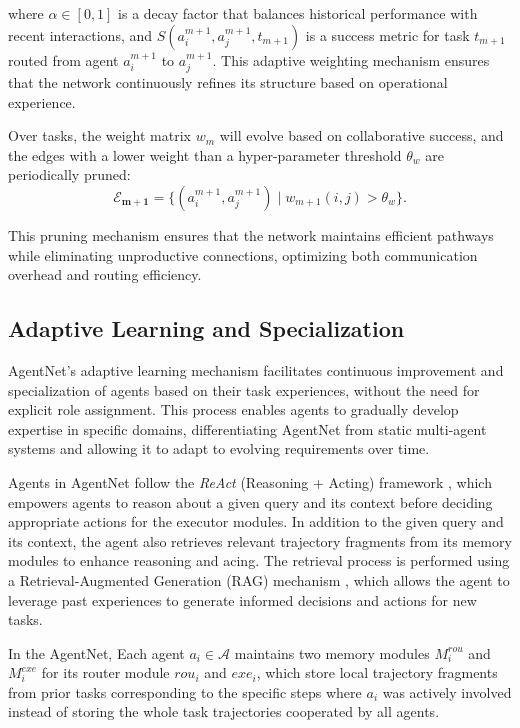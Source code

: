 \documentclass{article}
\begin{document}
where $\alpha \in [0,1]$ is a decay factor that balances historical performance with recent interactions, and $S(a_i^{m+1}, a_j^{m+1}, t_{m+1})$ is a success metric for task $t_{m+1}$ routed from agent $a_i^{m+1}$ to $a_j^{m+1}$. This adaptive weighting mechanism ensures that the network continuously refines its structure based on operational experience.

Over tasks, the weight matrix $w_m$ will evolve based on collaborative success, and the edges with a lower weight than a hyper-parameter threshold $\theta_w$ are periodically pruned:
\begin{equation}
\boldsymbol{\mathcal{E}_{m+1}} = \{(a_i^{m+1}, a_j^{m+1}) \mid w_{m+1}(i, j)> \theta_w\}.
\end{equation}

This pruning mechanism ensures that the network maintains efficient pathways while eliminating unproductive connections, optimizing both communication overhead and routing efficiency.



\subsection{Adaptive Learning and Specialization}
AgentNet's adaptive learning mechanism facilitates continuous improvement and specialization of agents based on their task experiences, without the need for explicit role assignment. This process enables agents to gradually develop expertise in specific domains, differentiating AgentNet from static multi-agent systems and allowing it to adapt to evolving requirements over time.

Agents in AgentNet follow the \textit{ReAct} (Reasoning + Acting) framework \cite{yao2023reactsynergizingreasoningacting, zhou2024tradenhancingllmagents}, which empowers agents to reason about a given query and its context before deciding appropriate actions for the executor modules. In addition to the given query and its context, the agent also retrieves relevant trajectory fragments from its memory modules to enhance reasoning and acing. The retrieval process is performed using a Retrieval-Augmented Generation (RAG) mechanism \citep{lewis2020retrieval,gao2023retrieval, zhou2024tradenhancingllmagents}, which allows the agent to leverage past experiences to generate informed decisions and actions for new tasks.

In the AgentNet, Each agent $a_i\in \boldsymbol{\mathcal{A}}$ maintains two memory modules $M_i^{rou}$ and $M_i^{exe}$ for its router module $rou_i$ and $exe_i$, which store local trajectory fragments from prior tasks corresponding to the specific steps where $a_i$ was actively involved instead of storing the whole task trajectories cooperated by all agents.
\end{document}
